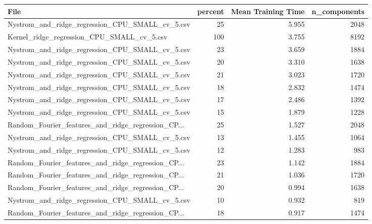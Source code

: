 \begin{tabularx}{\textwidth}{lrrr}
\toprule
                                              File &  percent &  Mean Training Time &  n\_components \\
\midrule
   Nystrom\_and\_ridge\_regression\_CPU\_SMALL\_cv\_5.csv &       25 &               5.955 &          2048 \\
        Kernel\_ridge\_regression\_CPU\_SMALL\_cv\_5.csv &      100 &               3.755 &          8192 \\
   Nystrom\_and\_ridge\_regression\_CPU\_SMALL\_cv\_5.csv &       23 &               3.659 &          1884 \\
   Nystrom\_and\_ridge\_regression\_CPU\_SMALL\_cv\_5.csv &       20 &               3.310 &          1638 \\
   Nystrom\_and\_ridge\_regression\_CPU\_SMALL\_cv\_5.csv &       21 &               3.023 &          1720 \\
   Nystrom\_and\_ridge\_regression\_CPU\_SMALL\_cv\_5.csv &       18 &               2.832 &          1474 \\
   Nystrom\_and\_ridge\_regression\_CPU\_SMALL\_cv\_5.csv &       17 &               2.486 &          1392 \\
   Nystrom\_and\_ridge\_regression\_CPU\_SMALL\_cv\_5.csv &       15 &               1.879 &          1228 \\
Random\_Fourier\_features\_and\_ridge\_regression\_CP... &       25 &               1.527 &          2048 \\
   Nystrom\_and\_ridge\_regression\_CPU\_SMALL\_cv\_5.csv &       13 &               1.455 &          1064 \\
   Nystrom\_and\_ridge\_regression\_CPU\_SMALL\_cv\_5.csv &       12 &               1.283 &           983 \\
Random\_Fourier\_features\_and\_ridge\_regression\_CP... &       23 &               1.142 &          1884 \\
Random\_Fourier\_features\_and\_ridge\_regression\_CP... &       21 &               1.036 &          1720 \\
Random\_Fourier\_features\_and\_ridge\_regression\_CP... &       20 &               0.994 &          1638 \\
   Nystrom\_and\_ridge\_regression\_CPU\_SMALL\_cv\_5.csv &       10 &               0.932 &           819 \\
Random\_Fourier\_features\_and\_ridge\_regression\_CP... &       18 &               0.917 &          1474 \\

\end{tabularx}
